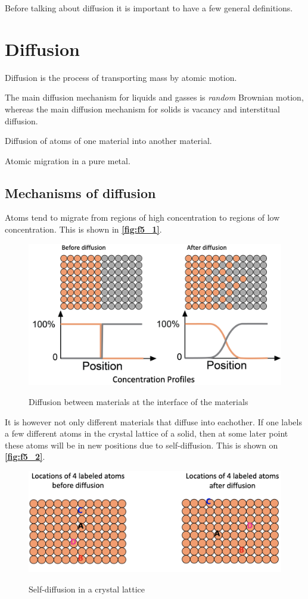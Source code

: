Before talking about diffusion it is important to have a few general definitions.

\section{Diffusion}

\begin{definition}[Diffusion]
  Diffusion is the process of transporting mass by atomic motion.
\end{definition}

\begin{definition}
  The main diffusion mechanism for liquids and gasses is \textit{random} Brownian motion, whereas the main diffusion mechanism for solids is vacancy and interstitual diffusion.
\end{definition}

\begin{definition}[Interdiffusion]
  Diffusion of atoms of one material into another material.
\end{definition}

\begin{definition}
  Atomic migration in a pure metal.
\end{definition}

\subsection{Mechanisms of diffusion}
Atoms tend to migrate from regions of high concentration to regions of low concentration. This is shown in \textbf{\autoref{fig:f5_1}}.
\begin{figure} [ht]
  \centering
  \caption{Diffusion between materials at the interface of the materials}
  \includegraphics[width=0.5\linewidth]{./figures/f5_1.png}
  \label{fig:f5_1}
\end{figure}

It is however not only different materials that diffuse into eachother. If one labels a few different atoms in the crystal lattice of a solid, then at some later point these atoms will be in new positions due to self-diffusion. This is shown on \textbf{\autoref{fig:f5_2}}.
\begin{figure} [ht]
  \centering
  \caption{Self-diffusion in a crystal lattice}
  \includegraphics[width=0.5\linewidth]{./figures/f5_2.png}
  \label{fig:f5_2}
\end{figure}

